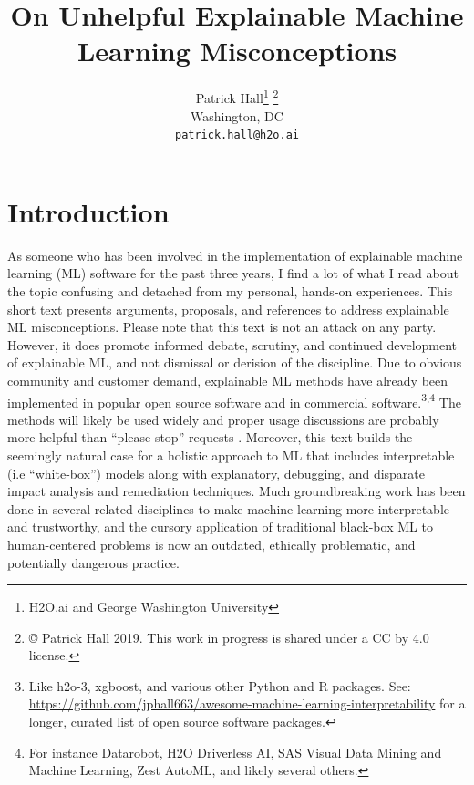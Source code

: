 \documentclass[fleqn]{article}
\title{On Unhelpful Explainable Machine Learning Misconceptions}
\author{
  Patrick Hall\footnote{H2O.ai and George Washington University} \footnote{\copyright \hspace{1pt} Patrick Hall 2019. This work in progress is shared under a CC by 4.0 license.}\\
  Washington, DC\\
  \texttt{patrick.hall@h2o.ai}
}
\begin{document}
\maketitle

\section*{Introduction}

As someone who has been involved in the implementation of explainable machine learning (ML) software for the past three years, I find a lot of what I read about the topic confusing and detached from my personal, hands-on experiences. This short text presents arguments, proposals, and references to address explainable ML misconceptions. Please note that this text is not an attack on any party. However, it does promote informed debate, scrutiny, and continued development of explainable ML, and not dismissal or derision of the discipline. Due to obvious community and customer demand, explainable ML methods have already been implemented in popular open source software and in commercial software.\footnote{Like h2o-3, xgboost, and various other Python and R packages. See: \url{https://github.com/jphall663/awesome-machine-learning-interpretability} for a longer, curated list of open source software packages.}\textsuperscript{,}\footnote{For instance  Datarobot, H2O Driverless AI, SAS Visual Data Mining and Machine Learning, Zest AutoML, and likely several others.} The methods will likely be used widely and proper usage discussions are probably more helpful than ``please stop'' requests \cite{please_stop}. Moreover, this text builds the seemingly natural case for a holistic approach to ML that includes interpretable (i.e ``white-box'') models along with explanatory, debugging, and disparate impact analysis and remediation techniques. Much groundbreaking work has been done in several related disciplines to make machine learning more interpretable and trustworthy, and the cursory application of traditional black-box ML to human-centered problems is now an outdated, ethically problematic, and potentially dangerous practice.\\
\end{document}
